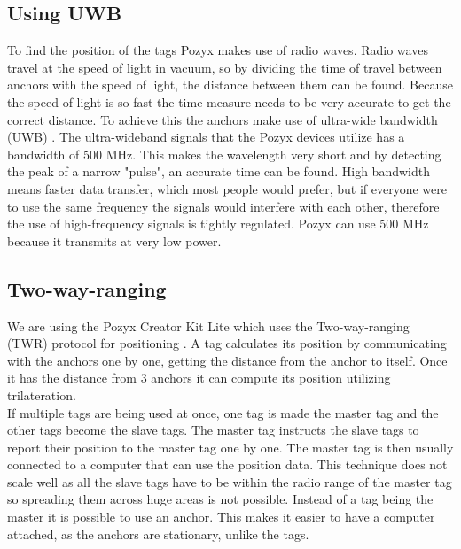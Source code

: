 \subsection{Using UWB}
To find the position of the tags Pozyx makes use of radio waves. 
Radio waves travel at the speed of light in vacuum, so by dividing the time of travel between anchors with the speed of light, the distance between them can be found.
Because the speed of light is so fast the time measure needs to be very accurate to get the correct distance.
To achieve this the anchors make use of ultra-wide bandwidth (UWB) \cite{pozyx-UWB}.
The ultra-wideband signals that the Pozyx devices utilize has a bandwidth of 500 MHz.
This makes the wavelength very short and by detecting the peak of a narrow "pulse", an accurate time can be found.
High bandwidth means faster data transfer, which most people would prefer, but if everyone were to use the same frequency the signals would interfere with each other, therefore the use of high-frequency signals is tightly regulated.
Pozyx can use 500 MHz because it transmits at very low power.

\subsection{Two-way-ranging}
We are using the Pozyx Creator Kit Lite which uses the Two-way-ranging (TWR) protocol for positioning \cite{pozyx-Positioning}.
A tag calculates its position by communicating with the anchors one by one, getting the distance from the anchor to itself.
Once it has the distance from 3 anchors it can compute its position utilizing trilateration.
\\
If multiple tags are being used at once, one tag is made the master tag and the other tags become the slave tags.
The master tag instructs the slave tags to report their position to the master tag one by one.
The master tag is then usually connected to a computer that can use the position data.
This technique does not scale well as all the slave tags have to be within the radio range of the master tag so spreading them across huge areas is not possible.
Instead of a tag being the master it is possible to use an anchor.
This makes it easier to have a computer attached, as the anchors are stationary, unlike the tags.
